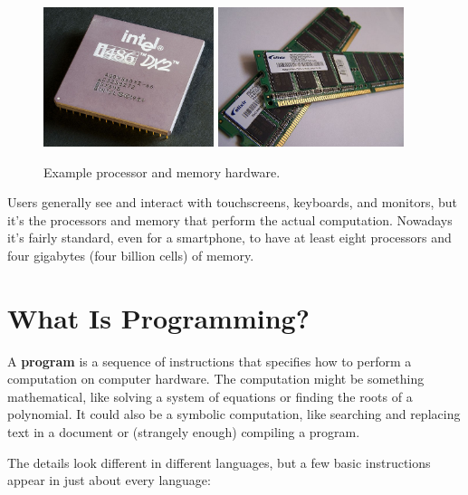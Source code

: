 \begin{figure}[!ht]
\begin{center}
\includegraphics[height=11em]{figs/CPU.jpg}
\hspace{2em}
\includegraphics[height=11em]{figs/RAM.jpg}
\caption{Example processor and memory hardware.}
\label{fig.cpuram}
\end{center}
\end{figure}

Users generally see and interact with touchscreens, keyboards, and monitors, but it's the processors and memory that perform the actual computation.
Nowadays it's fairly standard, even for a smartphone, to have at least eight processors and four gigabytes (four billion cells) of memory.


\section{What Is Programming?}


A {\bf program} is a sequence of instructions that specifies how to perform a computation on computer hardware.
The computation might be something mathematical, like solving a system of equations or finding the roots of a polynomial.
It could also be a symbolic computation, like searching and replacing text in a document or (strangely enough) compiling a program.

The details look different in different languages, but a few basic instructions appear in just about every language:

